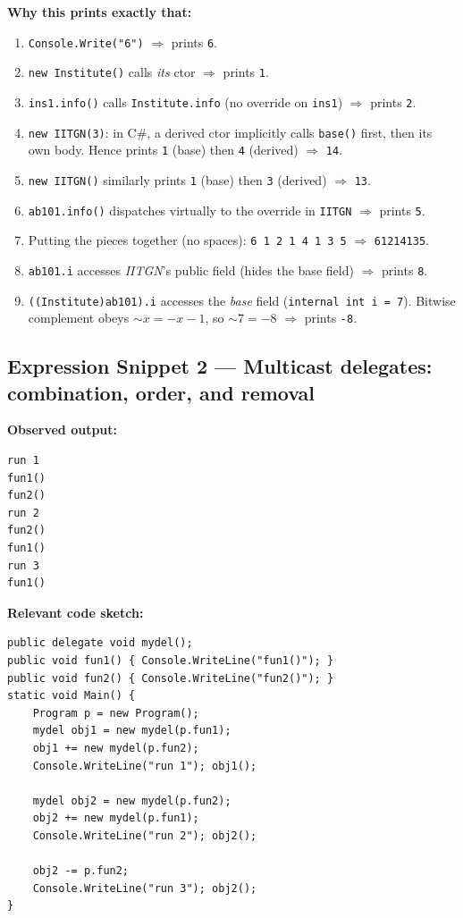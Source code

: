 \textbf{Why this prints exactly that:}
\begin{enumerate}
  \item \verb|Console.Write("6")| $\Rightarrow$ prints \verb|6|.
  \item \verb|new Institute()| calls \emph{its} ctor $\Rightarrow$ prints \verb|1|.
  \item \verb|ins1.info()| calls \verb|Institute.info| (no override on \verb|ins1|) $\Rightarrow$ prints \verb|2|.
  \item \verb|new IITGN(3)|: in C\#, a derived ctor implicitly calls \verb|base()| first, then its own body. Hence prints \verb|1| (base) then \verb|4| (derived) $\Rightarrow$ \verb|14|.
  \item \verb|new IITGN()| similarly prints \verb|1| (base) then \verb|3| (derived) $\Rightarrow$ \verb|13|.
  \item \verb|ab101.info()| dispatches virtually to the override in \verb|IITGN| $\Rightarrow$ prints \verb|5|.
  \item Putting the pieces together (no spaces): \verb|6 1 2 1 4 1 3 5| $\Rightarrow$ \verb|61214135|.
  \item \verb|ab101.i| accesses \emph{IITGN}'s public field (hides the base field) $\Rightarrow$ prints \verb|8|.
  \item \verb|((Institute)ab101).i| accesses the \emph{base} field (\verb|internal int i = 7|). Bitwise complement obeys \(\sim x = -x - 1\), so \(\sim 7 = -8\) $\Rightarrow$ prints \verb|-8|.
\end{enumerate}

\subsection*{Expression Snippet 2 — Multicast delegates: combination, order, and removal}
\textbf{Observed output:}
\begin{verbatim}
run 1
fun1()
fun2()
run 2
fun2()
fun1()
run 3
fun1()
\end{verbatim}

\textbf{Relevant code sketch:}
\begin{verbatim}
public delegate void mydel();
public void fun1() { Console.WriteLine("fun1()"); }
public void fun2() { Console.WriteLine("fun2()"); }
static void Main() {
    Program p = new Program();
    mydel obj1 = new mydel(p.fun1);
    obj1 += new mydel(p.fun2);
    Console.WriteLine("run 1"); obj1();

    mydel obj2 = new mydel(p.fun2);
    obj2 += new mydel(p.fun1);
    Console.WriteLine("run 2"); obj2();

    obj2 -= p.fun2;
    Console.WriteLine("run 3"); obj2();
}
\end{verbatim}

